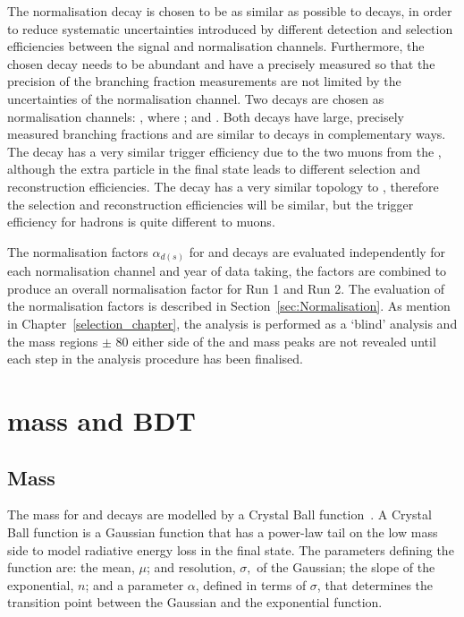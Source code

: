 The normalisation decay is chosen to be as similar as possible to \bmumu decays, in order to reduce systematic uncertainties introduced by different detection and selection efficiencies between the signal and normalisation channels. Furthermore, the chosen decay needs to be abundant and have a precisely measured \BF so that the precision of the \bmumu branching fraction measurements are not limited by the uncertainties of the normalisation channel. Two decays are chosen as normalisation channels: \bujpsik, where \jpsimumu; and \bdkpi. Both decays have large, precisely measured branching fractions and are similar to \bmumu decays in complementary ways. The \bujpsik decay has a very similar trigger efficiency due to the two muons from the \jpsi, although the extra particle in the final state leads to different selection and reconstruction efficiencies. The \bdkpi decay has a very similar topology to \bmumu, therefore the selection and reconstruction efficiencies will be similar, but the trigger efficiency for hadrons is quite different to muons.  

The normalisation factors $\alpha_{d(s)}$ for \bdmumu and \bsmumu decays are evaluated independently for each normalisation channel and year of data taking, the factors are combined to produce an overall normalisation factor for Run 1 and Run 2. The evaluation of the normalisation factors is described in Section~\ref{sec:Normalisation}.
As mention in Chapter~\ref{selection_chapter}, the analysis is performed as a `blind' analysis and the mass regions $\pm$ 80 \mevcc either side of the \bs and \bd mass peaks are not revealed until each step in the analysis procedure has been finalised. 
\section[\bmumu mass and BDT \pdfs]{\boldmath{\bmumu} mass and BDT \pdfs}
\label{sec:signalPdfs}

\subsection{Mass \pdfs}
The mass \pdfs for \bdmumu and \bsmumu decays are modelled by a Crystal Ball function~\cite{Skwarnicki:1986xj}. A Crystal Ball function is a Gaussian function that has a power-law tail on the low mass side to model radiative energy loss in the final state. The parameters defining the function are: the mean, $\mu$; and resolution, $\sigma,$ of the Gaussian; the slope of the exponential, $n$; and a parameter $\alpha$, defined in terms of $\sigma$, that determines the transition point between the Gaussian and the exponential function. 

